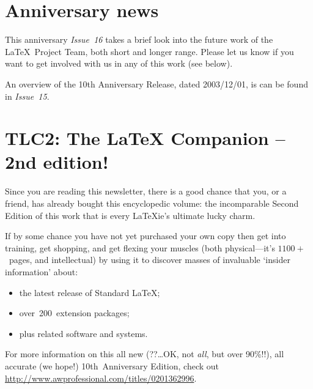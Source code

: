 \documentclass{ltnews}
\begin{document}
\maketitle


\section{Anniversary news}

This  anniversary \textit{Issue~16} takes a brief look into the future work of
the \LaTeX\ Project Team, both short and longer range.  Please let
us know if you want %
to get involved with us in any of this work (see below).

An overview of the 10th Anniversary Release, dated 2003/12/01, is
can be found in \textit{Issue~15}.


\section{TLC2: The \LaTeX{} Companion -- 2nd edition!}

Since you are reading this newsletter, there is a good chance that
you, or a friend, has already bought this encyclopedic volume: the
incomparable Second\newline
Edition of this work that is every \LaTeX{}ie's\newline
ultimate lucky charm.

If by some chance you have not yet purchased your own copy then get
into training, get shopping, and get flexing your muscles (both
physical---it's $1100+$~pages,\newline
and intellectual) by using it to discover
masses of invaluable `insider information' about:
\begin{itemize}
\item the latest release of Standard \LaTeX{};
\item over~200~extension packages;
\item plus related software and systems.
\end{itemize}
For more information on this all new (??\ldots OK,\newline
not \emph{all}, but over 90\%!!),
all accurate (we hope!)\newline
10th~Anniversary Edition, check out\newline
 \mbox{\url{http://www.awprofessional.com/titles/0201362996}}.
\end{document}
